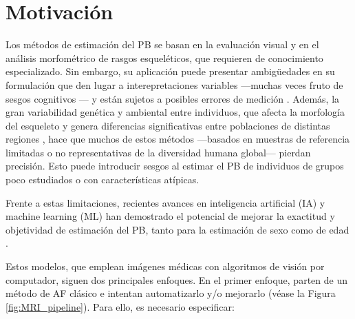 

\section{Motivación}

Los métodos de estimación del PB se basan en la evaluación visual y en el análisis morfométrico de rasgos 
esqueléticos, que requieren de conocimiento especializado. Sin embargo, su aplicación puede presentar 
ambigüedades en su formulación que den lugar a interepretaciones variables ---muchas veces fruto de sesgos 
cognitivos \cite{nakhaeizadeh2014, cooper2019}--- y están sujetos a posibles errores de medición 
\cite{langley2018}.
Además, la gran variabilidad genética y ambiental entre individuos, que afecta la morfología del esqueleto y 
genera diferencias significativas entre poblaciones de distintas regiones \cite{ubelaker2017}, hace que muchos 
de estos métodos ---basados en muestras de referencia limitadas o no representativas de la diversidad humana 
global--- pierdan precisión. Esto puede introducir sesgos al estimar el PB de individuos de 
grupos poco estudiados o con características atípicas.

Frente a estas limitaciones, recientes avances en inteligencia artificial (IA) y machine learning (ML) han 
demostrado el potencial de mejorar la exactitud y objetividad de estimación del PB, tanto para la estimación 
de sexo \cite{curate2017, darmawan2015, pinto2016} como de edad \cite{kim2017, larson2018, lee2017}. 

Estos modelos, que emplean imágenes médicas con algoritmos de visión por computador, siguen dos principales enfoques.
En el primer enfoque, parten de un método de AF clásico e intentan automatizarlo y/o mejorarlo 
\cite{stern2014, ajafernandez2004} (véase la Figura \ref{fig:MRI_pipeline}). 
Para ello, es necesario especificar:


